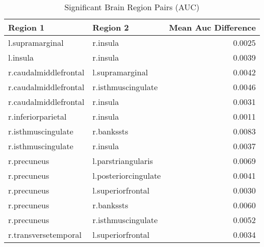\begin{table}
\caption{Significant Brain Region Pairs (AUC)}
\label{tab:significant_auc}
\begin{tabular}{llr}
\toprule
Region 1 & Region 2 & Mean Auc Difference \\
\midrule
l.supramarginal & r.insula & 0.0025 \\
l.insula & r.insula & 0.0039 \\
r.caudalmiddlefrontal & l.supramarginal & 0.0042 \\
r.caudalmiddlefrontal & r.isthmuscingulate & 0.0046 \\
r.caudalmiddlefrontal & r.insula & 0.0031 \\
r.inferiorparietal & r.insula & 0.0011 \\
r.isthmuscingulate & r.bankssts & 0.0083 \\
r.isthmuscingulate & r.insula & 0.0037 \\
r.precuneus & l.parstriangularis & 0.0069 \\
r.precuneus & l.posteriorcingulate & 0.0041 \\
r.precuneus & l.superiorfrontal & 0.0030 \\
r.precuneus & r.bankssts & 0.0060 \\
r.precuneus & r.isthmuscingulate & 0.0052 \\
r.transversetemporal & l.superiorfrontal & 0.0034 \\
\bottomrule
\end{tabular}
\end{table}
